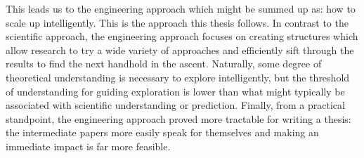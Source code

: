 This leads us to the engineering approach which might be summed up as: how to scale up intelligently.
This is the approach this thesis follows.
In contrast to the scientific approach, the engineering approach focuses on creating structures which allow research to try a wide variety of approaches and efficiently sift through the results to find the next handhold in the ascent.
Naturally, some degree of theoretical understanding is necessary to explore intelligently, but the threshold of understanding for guiding exploration is lower than what might typically be associated with scientific understanding or prediction.
Finally, from a practical standpoint, the engineering approach proved more tractable for writing a thesis: the intermediate papers more easily speak for themselves and making an immediate impact is far more feasible.
\fi




% 

